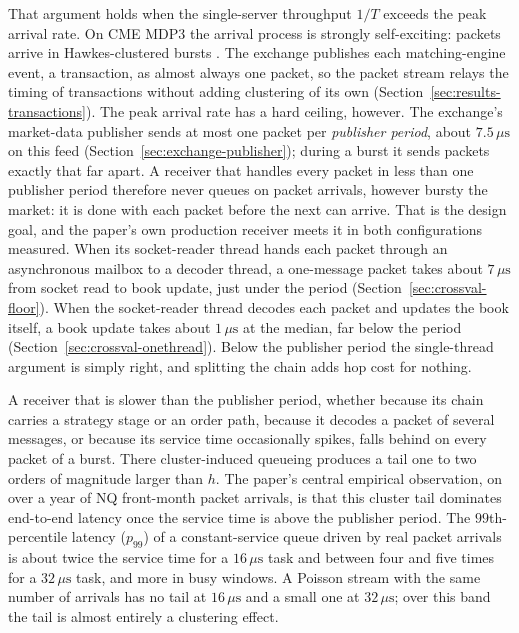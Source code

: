 \documentclass[11pt]{article}
\begin{document}
That argument holds when the single-server throughput $1/T$ exceeds the peak arrival
rate. On CME MDP3 the arrival process is strongly self-exciting: packets arrive in
Hawkes-clustered bursts \citep{filimonovsornette2012,hardimanbercotbouchaud2013,bacry2015review}.
The exchange publishes each matching-engine event, a transaction, as almost always one
packet, so the packet stream relays the timing of transactions without adding clustering
of its own (Section~\ref{sec:results-transactions}). The peak arrival rate has a hard
ceiling, however. The exchange's market-data publisher sends at most one packet per
\emph{publisher period}, about $7.5\,\mu\mathrm{s}$ on this feed
(Section~\ref{sec:exchange-publisher}); during a burst it sends packets exactly that far
apart. A receiver that handles every packet in less than one publisher period therefore
never queues on packet arrivals, however bursty the market: it is done with each packet
before the next can arrive. That is the design goal, and the paper's own production
receiver meets it in both configurations measured. When its socket-reader thread hands
each packet through an asynchronous mailbox to a decoder thread, a one-message packet
takes about $7\,\mu\mathrm{s}$ from socket read to book update, just under the period
(Section~\ref{sec:crossval-floor}). When the socket-reader thread decodes each packet and
updates the book itself, a book update takes about $1\,\mu\mathrm{s}$ at the median, far
below the period (Section~\ref{sec:crossval-onethread}). Below the publisher period the
single-thread argument is simply right, and splitting the chain adds hop cost for nothing.

A receiver that is slower than the publisher period, whether because its chain carries a
strategy stage or an order path, because it decodes a packet of several messages, or
because its service time occasionally spikes, falls behind on every packet of a burst.
There cluster-induced queueing produces a tail one to two orders of magnitude larger than
$h$. The paper's central empirical observation, on over a year of NQ front-month packet
arrivals, is that this cluster tail dominates end-to-end latency once the service time
is above the publisher period. The $99$th-percentile latency ($p_{99}$) of a
constant-service queue driven by real packet arrivals is about twice the service time for
a $16\,\mu\mathrm{s}$ task and between four and five times for a $32\,\mu\mathrm{s}$ task,
and more in busy windows. A Poisson stream with the same number of arrivals has no tail
at $16\,\mu\mathrm{s}$ and a small one at $32\,\mu\mathrm{s}$; over this band the tail is
almost entirely a clustering effect.
\end{document}

